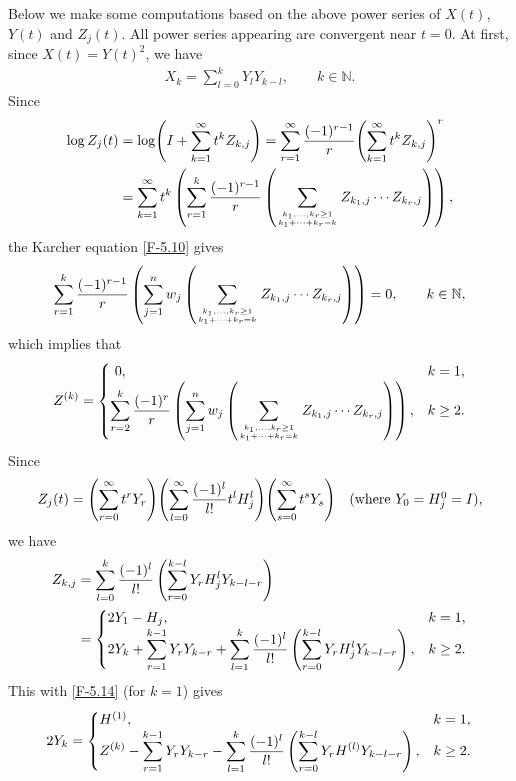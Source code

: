 \documentclass[11pt,reqno]{article}
\numberwithin{equation}{section}
\def\bN{\mathbb{N}}
\begin{document}
Below we make some computations based on the above power series of $X(t)$, $Y(t)$ and $Z_j(t)$. All power
series appearing are convergent near $t=0$. At first, since $X(t)=Y(t)^2$, we have
\begin{align}\label{F-5.13}
X_k=\sum_{l=0}^kY_lY_{k-l},\qquad k\in\bN.
\end{align}
Since
\begin{align*}
\log Z_j(t)&=\log\Biggl(I+\sum_{k=1}^\infty t^kZ_{k,j}\Biggr)
=\sum_{r=1}^\infty{(-1)^{r-1}\over r}\Biggl(\sum_{k=1}^\infty t^kZ_{k,j}\Biggr)^r \\
&=\sum_{k=1}^\infty t^k\left(\sum_{r=1}^k{(-1)^{r-1}\over r}\left(
\sum_{k_1,\dots,k_r\ge1\atop{k_1+\cdots+k_r=k}}Z_{k_1,j}\cdots Z_{k_r,j}\right)\right),
\end{align*}
the Karcher equation \eqref{F-5.10} gives
\[
\sum_{r=1}^k{(-1)^{r-1}\over r}\left(\sum_{j=1}^nw_j\left(
\sum_{k_1,\dots,k_r\ge1\atop{k_1+\cdots+k_r=k}}Z_{k_1,j}\cdots Z_{k_r,j}\right)\right)=0,
\qquad k\in\bN,
\]
which implies that
\begin{align}\label{F-5.14}
Z^{(k)}=\begin{cases}\ 0, & k=1, \\
\displaystyle \sum_{r=2}^k{(-1)^r\over r}\left(\sum_{j=1}^nw_j
\left(\sum_{k_1,\dots,k_r\ge1\atop{k_1+\cdots+k_r=k}}Z_{k_1,j}\cdots Z_{k_r,j}\right)\right),
& k\ge2.\end{cases}
\end{align}
Since
\[
Z_j(t)=\Biggl(\sum_{r=0}^\infty t^rY_r\Biggr)\Biggl(\sum_{l=0}^\infty{(-1)^l\over l!}t^lH_j^l\Biggr)
\Biggl(\sum_{s=0}^\infty t^sY_s\Biggr)
\quad(\mbox{where $Y_0=H_j^0=I$}),
\]
we have
\begin{align}
Z_{k,j}&=\sum_{l=0}^k{(-1)^l\over l!}\left(\sum_{r=0}^{k-l}Y_rH_j^lY_{k-l-r}\right) \nonumber\\
&=\begin{cases}2Y_1-H_j, & k=1, \\
\displaystyle 2Y_k+\sum_{r=1}^{k-1}Y_rY_{k-r}+\sum_{l=1}^k{(-1)^l\over l!}
\left(\sum_{r=0}^{k-l}Y_rH_j^lY_{k-l-r}\right), & k\ge2.\end{cases}\label{F-5.15}
\end{align}
This with \eqref{F-5.14} (for $k=1$) gives
\begin{align}\label{F-5.16}
2Y_k=\begin{cases}H^{(1)}, & k=1, \\
\displaystyle Z^{(k)}-\sum_{r=1}^{k-1}Y_rY_{k-r}-\sum_{l=1}^k{(-1)^l\over l!}
\left(\sum_{r=0}^{k-l}Y_rH^{(l)}Y_{k-l-r}\right), & k\ge2.\end{cases}
\end{align}
\end{document}
